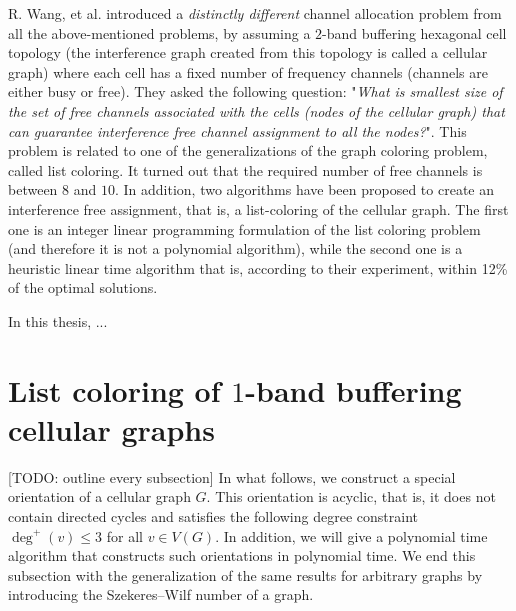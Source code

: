 \documentclass[a4paper, 12pt]{article}
\begin{document}
R. Wang, et al. \cite{7248845} introduced a \textit{distinctly different} channel allocation problem from all the above-mentioned problems, by assuming a $2$-band buffering hexagonal cell topology (the interference graph created from this topology is called a cellular graph) where each cell has a fixed number of frequency channels (channels are either busy or free). They asked the following question: "\textit{What is smallest size of the set of free channels associated with the cells (nodes of the cellular graph) that can guarantee interference free channel assignment to all the nodes?}". This problem is related to one of the generalizations of the graph coloring problem, called list coloring. It turned out that the required number of free channels is between $8$ and $10$. In addition, two algorithms have been proposed to create an interference free assignment, that is, a list-coloring of the cellular graph. The first one is an integer linear programming formulation of the list coloring problem (and therefore it is not a polynomial algorithm), while the second one is a heuristic linear time algorithm that is, according to their experiment, within 12\% of the optimal solutions.

In this thesis, ...
\newpage
\section{List coloring of $1$-band buffering cellular graphs}
[TODO: outline every subsection] In what follows, we construct a special orientation of a cellular graph $G$. This orientation is acyclic, that is, it does not contain directed cycles and satisfies the following degree constraint $\deg^+(v) \leqslant 3$ for all $v \in V(G)$. In addition, we will give a polynomial time algorithm that constructs such orientations in polynomial time. We end this subsection with the generalization of the same results for arbitrary graphs by introducing the Szekeres\---Wilf number of a graph.
\end{document}
